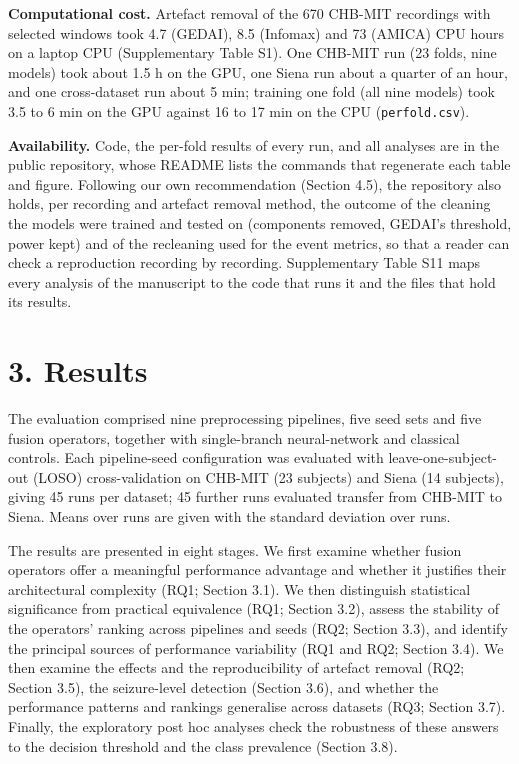\documentclass[11pt,a4paper]{article}
\begin{document}
\textbf{Computational cost.} Artefact removal of the 670 CHB-MIT recordings with selected
windows took 4.7 (GEDAI), 8.5 (Infomax) and 73 (AMICA) CPU hours on a laptop CPU
(Supplementary Table S1). One CHB-MIT run (23 folds, nine models) took about 1.5 h on
the GPU, one Siena run about a quarter of an hour, and one cross-dataset run about
5 min; training one fold (all nine models) took 3.5 to 6 min on the GPU against 16 to
17 min on the CPU (\nolinkurl{perfold.csv}).

\textbf{Availability.} Code, the per-fold results of every run, and all analyses are in the
public repository, whose README lists the commands that regenerate each table and figure.
Following our own recommendation (Section 4.5), the repository also holds, per recording
and artefact removal method, the outcome of the cleaning the models were trained and
tested on (components removed, GEDAI's threshold, power kept) and of the recleaning used for the
event metrics, so that a reader can check a reproduction recording
by recording. Supplementary Table S11 maps every analysis of the manuscript to the code
that runs it and the files that hold its results.

\section{3. Results}\label{results}

The evaluation comprised nine preprocessing pipelines, five seed sets and five fusion
operators, together with single-branch neural-network and classical controls. Each
pipeline-seed configuration was evaluated with leave-one-subject-out (LOSO)
cross-validation on CHB-MIT (23 subjects) and Siena (14 subjects), giving 45 runs per
dataset; 45 further runs evaluated transfer from CHB-MIT to Siena.
Means over runs are given with the standard deviation over runs.

The results are presented in eight stages. We first examine whether fusion operators
offer a meaningful performance advantage and whether it justifies their architectural
complexity (RQ1; Section 3.1). We then distinguish statistical significance from
practical equivalence (RQ1; Section 3.2), assess the stability of the operators' ranking
across pipelines and seeds (RQ2; Section 3.3), and identify the principal sources of
performance variability (RQ1 and RQ2; Section 3.4). We then examine the effects and the
reproducibility of artefact removal (RQ2; Section 3.5), the seizure-level detection
(Section 3.6), and whether the performance patterns and rankings generalise across
datasets (RQ3; Section 3.7). Finally, the exploratory post hoc analyses check the
robustness of these answers to the decision threshold and the class prevalence
(Section 3.8).
\end{document}
